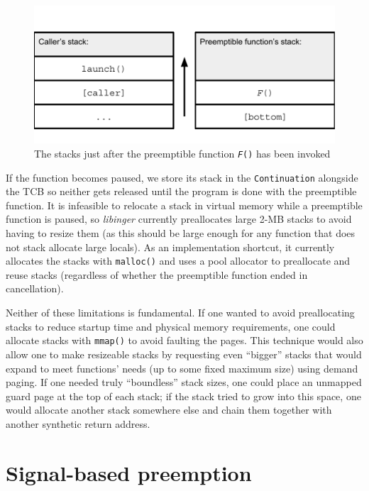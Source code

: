 \begin{figure}
\includegraphics[width=\columnwidth]{figs/twostacks}
\caption{The stacks just after the preemptible function \texttt{\textit{F}()} has been invoked}
\label{fig:twostacks}
\end{figure}

If the function becomes paused, we store its stack in the \texttt{Continuation}
alongside the TCB so neither gets released until the program is done with the
preemptible function.  It is infeasible to relocate a stack in virtual memory while a
preemptible function is paused, so \textit{libinger} currently preallocates large
2-MB stacks to avoid having to resize them (as this should be large enough for any
function that does not stack allocate large locals).  As an implementation shortcut,
it currently allocates the stacks with \texttt{malloc()} and uses a pool
allocator to preallocate and reuse stacks (regardless of whether the preemptible
function ended in cancellation).

Neither of these limitations is fundamental.  If one wanted to avoid preallocating
stacks to reduce startup time and physical memory requirements, one could allocate
stacks with \texttt{mmap()} to avoid faulting the pages.  This technique would also
allow one to make resizeable stacks by requesting even ``bigger'' stacks that would
expand to meet functions' needs (up to some fixed maximum size) using demand paging.
If one needed truly ``boundless'' stack sizes, one could place an unmapped guard page
at the top of each stack; if the stack tried to grow into this space, one would
allocate another stack somewhere else and chain them together with another synthetic
return address.


\section{Signal-based preemption}
\label{sec:libinger:signals}


